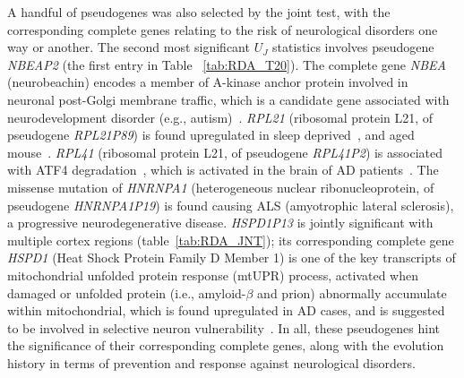 \documentclass[11pt]{article}
\begin{document}
A handful of pseudogenes was also selected by the joint test, with the corresponding complete genes relating to the risk of neurological disorders one way or another. The second most significant $U_J$ statistics involves pseudogene \textit{NBEAP2} (the first entry in Table ~\ref{tab:RDA_T20}). The complete gene \textit{NBEA} (neurobeachin) encodes a member of A-kinase anchor protein involved in neuronal post-Golgi membrane traffic, which is a candidate gene associated with neurodevelopment disorder (e.g., autism)~\citep{GN:NBEA1, GN:NBEA2, GN:NBEA3}. \textit{RPL21} (ribosomal protein L21, of pseudogene \textit{RPL21P89}) is found upregulated in sleep deprived~\citep{GN:RPL21_1}, and aged mouse~\citep{GN:RPL21_2}. \textit{RPL41} (ribosomal protein L21, of pseudogene \textit{RPL41P2}) is associated with ATF4 degradation~\citep{RPL41-ATF4}, which is activated in the brain of AD patients~\citep{ATF4-AD}. The missense mutation of \textit{HNRNPA1} (heterogeneous nuclear ribonucleoprotein, of pseudogene \textit{HNRNPA1P19}) is found causing ALS (amyotrophic lateral sclerosis), a progressive neurodegenerative disease. \textit{HSPD1P13} is jointly significant with multiple cortex regions (table~\ref{tab:RDA_JNT}); its corresponding complete gene \textit{HSPD1} (Heat Shock Protein Family D Member 1) is one of the key transcripts of mitochondrial unfolded protein response (mtUPR) process, activated when damaged or unfolded protein (i.e., amyloid-$\beta$ and prion) abnormally accumulate within mitochondrial, which is found upregulated in AD cases, and is suggested to be involved in selective neuron vulnerability~\citep{GN:HSPD1}. In all, these pseudogenes hint the significance of their corresponding complete genes, along with the evolution history in terms of prevention and response against neurological disorders.
\end{document}
